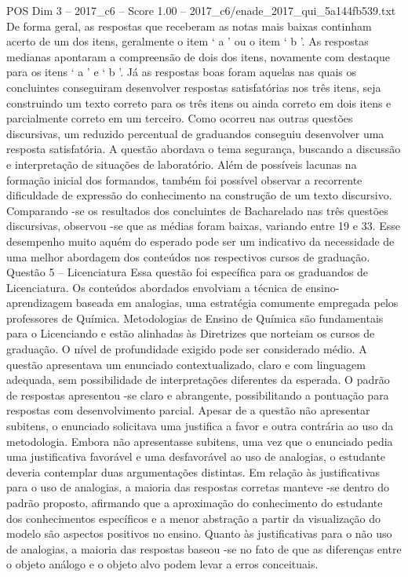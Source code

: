 \begin{textsample}{POS Dim 3 – 2017\_c6 – Score 1.00 – 2017\_c6/enade\_2017\_qui\_5a144fb539.txt}
De forma geral, as respostas que receberam as notas mais baixas continham acerto de um dos itens, geralmente o item ‘ a ’ ou o item ‘ b ’.
As respostas medianas apontaram a compreensão de dois dos itens, novamente com destaque para os itens ‘ a ’ e ‘ b ’.
Já as respostas boas foram aquelas nas quais os concluintes conseguiram desenvolver respostas satisfatórias nos três itens, seja construindo um texto correto para os três itens ou ainda correto em dois itens e parcialmente correto em um terceiro.
Como ocorreu nas outras questões discursivas, um reduzido percentual de graduandos conseguiu desenvolver uma resposta satisfatória.
A questão abordava o tema segurança, buscando a discussão e interpretação de situações de laboratório.
Além de possíveis lacunas na formação inicial dos formandos, também foi possível observar a recorrente dificuldade de expressão do conhecimento na construção de um texto discursivo.
Comparando -se os resultados dos concluintes de Bacharelado nas três questões discursivas, observou -se que as médias foram baixas, variando entre 19 e 33.
Esse desempenho muito aquém do esperado pode ser um indicativo da necessidade de uma melhor abordagem dos conteúdos nos respectivos cursos de graduação.
Questão 5 – Licenciatura Essa questão foi específica para os graduandos de Licenciatura.
Os conteúdos abordados envolviam a técnica de ensino-aprendizagem baseada em analogias, uma estratégia comumente empregada pelos professores de Química.
Metodologias de Ensino de Química são fundamentais para o Licenciando e estão alinhadas às Diretrizes que norteiam os cursos de graduação.
O nível de profundidade exigido pode ser considerado médio.
A questão apresentava um enunciado contextualizado, claro e com linguagem adequada, sem possibilidade de interpretações diferentes da esperada.
O padrão de respostas apresentou -se claro e abrangente, possibilitando a pontuação para respostas com desenvolvimento parcial.
Apesar de a questão não apresentar subitens, o enunciado solicitava uma justifica a favor e outra contrária ao uso da metodologia.
Embora não apresentasse subitens, uma vez que o enunciado pedia uma justificativa favorável e uma desfavorável ao uso de analogias, o estudante deveria contemplar duas argumentações distintas.
Em relação às justificativas para o uso de analogias, a maioria das respostas corretas manteve -se dentro do padrão proposto, afirmando que a aproximação do conhecimento do estudante dos conhecimentos específicos e a menor abstração a partir da visualização do modelo são aspectos positivos no ensino.
Quanto às justificativas para o não uso de analogias, a maioria das respostas baseou -se no fato de que as diferenças entre o objeto análogo e o objeto alvo podem levar a erros conceituais.

\end{textsample}
